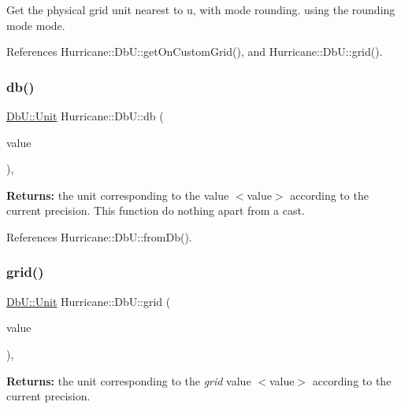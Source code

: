 Get the physical grid unit nearest to {\ttfamily u}, with {\ttfamily mode} rounding. using the rounding mode {\ttfamily mode}. 

References Hurricane\+::\+Db\+U\+::get\+On\+Custom\+Grid(), and Hurricane\+::\+Db\+U\+::grid().

\mbox{\label{group__DbUGroup_gacd77957381fb93fc4203bdca215e0b48}} 
\subsubsection{\texorpdfstring{db()}{db()}}
{\footnotesize\ttfamily \mbox{\hyperlink{group__DbUGroup_ga4fbfa3e8c89347af76c9628ea06c4146}{Db\+U\+::\+Unit}} Hurricane\+::\+Db\+U\+::db (\begin{DoxyParamCaption}\item[{\mbox{\hyperlink{group__DbUGroup_ga4fbfa3e8c89347af76c9628ea06c4146}{Db\+U\+::\+Unit}}}]{value }\end{DoxyParamCaption})\hspace{0.3cm}{\ttfamily [inline]}, {\ttfamily [static]}}

{\bfseries Returns\+:} the unit corresponding to the value {\ttfamily $<$value$>$} according to the current precision. This function do nothing apart from a cast. 

References Hurricane\+::\+Db\+U\+::from\+Db().

\mbox{\label{group__DbUGroup_ga1d4bac6e3b68c8cd44b345de3b425753}} 
\subsubsection{\texorpdfstring{grid()}{grid()}}
{\footnotesize\ttfamily \mbox{\hyperlink{group__DbUGroup_ga4fbfa3e8c89347af76c9628ea06c4146}{Db\+U\+::\+Unit}} Hurricane\+::\+Db\+U\+::grid (\begin{DoxyParamCaption}\item[{double}]{value }\end{DoxyParamCaption})\hspace{0.3cm}{\ttfamily [inline]}, {\ttfamily [static]}}

{\bfseries Returns\+:} the unit corresponding to the {\itshape grid} value {\ttfamily $<$value$>$} according to the current precision. 

